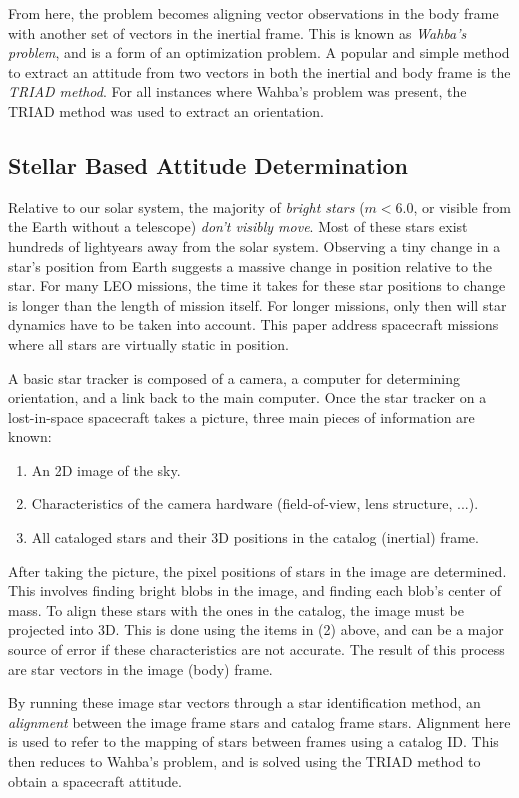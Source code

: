 From here, the problem becomes aligning vector observations in the body frame with another set of vectors in the inertial frame. This is known as \textit{Wahba's problem}, and is a form of an optimization problem. A popular and simple method to extract an attitude from two vectors in both the inertial and body frame is the \textit{TRIAD method}. For all instances where Wahba's problem was present, the TRIAD method was used to extract an orientation. 

\subsection{Stellar Based Attitude Determination}
Relative to our solar system, the majority of \textit{bright stars} ($m < 6.0$, or visible from the Earth without a telescope) \textit{don't visibly move}. Most of these stars exist hundreds of lightyears away from the solar system. Observing a tiny change in a star's position from Earth suggests a massive change in position relative to the star. For many LEO missions, the time it takes for these star positions to change is longer than the length of mission itself. For longer missions, only then will star dynamics have to be taken into account. This paper address spacecraft missions where all stars are virtually static in position.

A basic star tracker is composed of a camera, a computer for determining orientation, and a link back to the main computer. Once the star tracker on a lost-in-space spacecraft takes a picture, three main pieces of information are known:
\begin{enumerate}
\item An 2D image of the sky. 
\item Characteristics of the camera hardware (field-of-view, lens structure, ...).
\item All cataloged stars and their 3D positions in the catalog (inertial) frame.
\end{enumerate}

After taking the picture, the pixel positions of stars in the  image are determined. This involves finding bright blobs in the image, and finding each blob's center of mass. To align these stars with the ones in the catalog, the image must be projected into 3D. This is done using the items in (2) above, and can be a major source of error if these characteristics are not accurate. The result of this process are star vectors in the image (body) frame. 

By running these image star vectors through a star identification method, an \textit{alignment} between the image frame stars and catalog frame stars. Alignment here is used to refer to the mapping of stars between frames using a catalog ID. This then reduces to Wahba's problem, and is solved using the TRIAD method to obtain a spacecraft attitude.